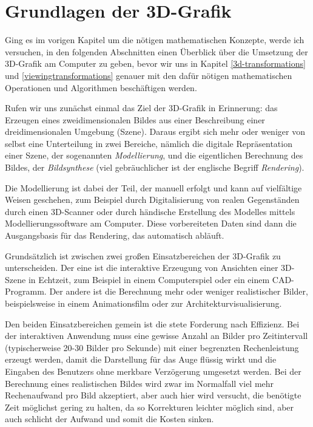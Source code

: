 \chapter{Grundlagen der 3D-Grafik}
\label{grafikgrundlagen}

Ging es im vorigen Kapitel um die nötigen mathematischen Konzepte, werde ich versuchen, in den folgenden Abschnitten einen Überblick über die Umsetzung der 3D-Grafik am Computer zu geben, bevor wir uns in Kapitel \ref{3d-transformations} und \ref{viewingtransformations} genauer mit den dafür nötigen mathematischen Operationen und Algorithmen beschäftigen werden.

Rufen wir uns zunächst einmal das Ziel der 3D-Grafik in Erinnerung: das Erzeugen eines zweidimensionalen Bildes aus einer Beschreibung einer dreidimensionalen Umgebung (Szene). Daraus ergibt sich mehr oder weniger von selbst eine Unterteilung in zwei Bereiche, nämlich die digitale Repräsentation einer Szene, der sogenannten \emph{Modellierung}, und die eigentlichen Berechnung des Bildes, der \emph{Bildsynthese} (viel gebräuchlicher ist der englische Begriff \emph{Rendering}).

Die Modellierung ist dabei der Teil, der manuell erfolgt und kann auf vielfältige Weisen geschehen, zum Beispiel durch Digitalisierung von realen Gegenständen durch einen 3D-Scanner oder durch händische Erstellung des Modelles mittels Modellierungssoftware am Computer. Diese vorbereiteten Daten sind dann die Ausgangsbasis für das Rendering, das automatisch abläuft.

Grundsätzlich ist zwischen zwei großen Einsatzbereichen der 3D-Grafik zu unterscheiden. Der eine ist die interaktive Erzeugung von Ansichten einer 3D-Szene in Echtzeit, zum Beispiel in einem Computerspiel oder ein einem CAD-Programm. Der andere ist die Berechnung mehr oder weniger realistischer Bilder, beispielsweise in einem Animationsfilm oder zur Architekturvisualisierung.

Den beiden Einsatzbereichen gemein ist die stete Forderung nach Effizienz. Bei der interaktiven Anwendung muss eine gewisse Anzahl an Bilder pro Zeitintervall (typischerweise 20-30 Bilder pro Sekunde) mit einer begrenzten Rechenleistung erzeugt werden, damit die Darstellung für das Auge flüssig wirkt und die Eingaben des Benutzers ohne merkbare Verzögerung umgesetzt werden. Bei der Berechnung eines realistischen Bildes wird zwar im Normalfall viel mehr Rechenaufwand pro Bild akzeptiert, aber auch hier wird versucht, die benötigte Zeit möglichst gering zu halten, da so Korrekturen leichter möglich sind, aber auch schlicht der Aufwand und somit die Kosten sinken.

